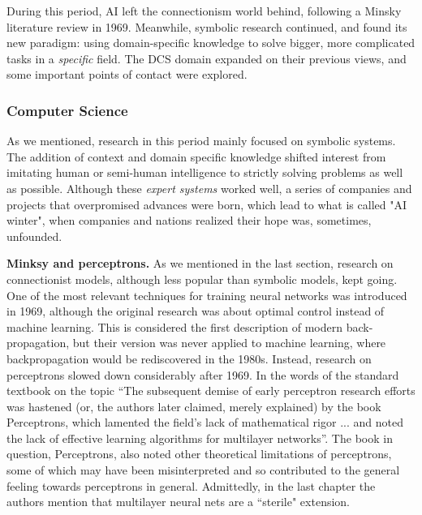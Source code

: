\documentclass[../main.tex]{subfiles}
\begin{document}
During this period, AI left the connectionism world behind, following a Minsky literature review in 1969. Meanwhile, symbolic research continued, and found its new paradigm: using domain-specific knowledge to solve bigger, more complicated tasks in a \textit{specific} field. The DCS domain expanded on their previous views, and some important points of contact were explored.

\subsubsection{Computer Science}
As we mentioned, research in this period mainly focused on symbolic systems. The addition of context and domain specific knowledge shifted interest from imitating human or semi-human intelligence to strictly solving problems as well as possible. Although these \textit{expert systems} worked well, a series of companies and projects that overpromised advances were born, which lead to what is called "AI winter", when companies and nations realized their hope was, sometimes, unfounded.

\vspace{4pt}
\textbf{Minksy and perceptrons.} As we mentioned in the last section, research on connectionist models, although less popular than symbolic models, kept going. One of the most relevant techniques for training neural networks was introduced in 1969\cite{brysonAppliedOptimalControl1969}, although the original research was about optimal control instead of machine learning. This is considered the first description of modern back-propagation\cite{lecunTheoreticalFrameworkBackpropagation1988}, but their version was never applied to machine learning, where backpropagation would be rediscovered in the 1980s. Instead, research on perceptrons slowed down considerably after 1969. In the words of the standard textbook on the topic \enquote{The subsequent demise of early perceptron research efforts was hastened (or, the authors later claimed, merely explained) by the book Perceptrons, which lamented the field's lack of mathematical rigor ... and noted the lack of effective learning algorithms for multilayer networks}. The book in question, Perceptrons\cite{minskyPerceptronIntroductionComputational1969}, also noted other theoretical limitations of perceptrons, some of which may have been misinterpreted and so contributed to the general feeling towards perceptrons in general. Admittedly, in the last chapter the authors mention that multilayer neural nets are a ``sterile" extension.
\end{document}
